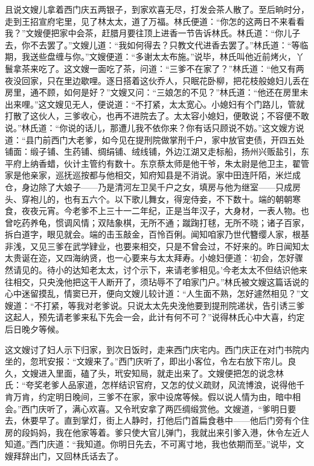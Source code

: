且说文嫂儿拿着西门庆五两银子，到家欢喜无尽，打发会茶人散了。至后晌时分，走到王招宣府宅里，见了林太太，道了万福。林氏便道：“你怎的这两日不来看看我？”文嫂便把家中会茶，赶腊月要往顶上进香一节告诉林氏。林氏道：“你儿子去，你不去罢了。”文嫂儿道：“我如何得去？只教文\textSiTang 代进香去罢了。”林氏道：“等临期，我送些盘缠与你。”文嫂便道：“多谢太太布施。”说毕，林氏叫他近前烤火，丫鬟拿茶来吃了。这文嫂一面吃了茶，问道：“三爹不在家了？”林氏道：“他又有两夜没回家，只在里边歇哩。逐日搭着这伙乔人，只眠花卧柳，把花枝般媳妇儿丢在房里，通不顾，如何是好？”文嫂又问：“三娘怎的不见？”林氏道：“他还在房里未出来哩。”这文嫂见无人，便说道：“不打紧，太太宽心。小媳妇有个门路儿，管就打散了这伙人，三爹收心，也再不进院去了。太太容小媳妇，便敢说；不容便不敢说。”林氏道：“你说的话儿，那遭儿我不依你来？你有话只顾说不妨。”这文嫂方说道：“县门前西门大老爹，如今见在提刑院做掌刑千户，家中放官吏债，开四五处铺面：缎子铺、生药铺、绸绢铺、绒线铺，外边江湖又走标船，扬州兴贩盐引，东平府上纳香蜡，伙计主管约有数十。东京蔡太师是他干爷，朱太尉是他卫主，翟管家是他亲家，巡抚巡按都与他相交，知府知县是不消说。家中田连阡陌，米烂成仓，身边除了大娘子——乃是清河左卫吴千户之女，填房与他为继室——只成房头、穿袍儿的，也有五六个。以下歌儿舞女，得宠侍妾，不下数十。端的朝朝寒食，夜夜元宵。今老爹不上三十一二年纪，正是当年汉子，大身材，一表人物。也曾吃药养龟，惯调风情；双陆象棋，无所不通；蹴踘打毬，无所不晓；诸子百家，拆白道字，眼见就会。端的击玉敲金，百怜百俐。闻知咱家乃世代簪缨人家，根基非浅，又见三爹在武学肄业，也要来相交，只是不曾会过，不好来的。昨日闻知太太贵诞在迩，又四海纳贤，也一心要来与太太拜寿。小媳妇便道：‘初会，怎好骤然请见的。待小的达知老太太，讨个示下，来请老爹相见。’今老太太不但结识他来往相交，只央浼他把这干人断开了，须玷辱不了咱家门户。”林氏被文嫂这篇话说的心中迷留摸乱，情窦已开，便向文嫂儿较计道：“人生面不熟，怎好遽然相见？”文嫂道：“不打紧，等我对老爹说。只说太太先央浼他要到提刑院递状，告引诱三爹这起人，预先请老爹来私下先会一会，此计有何不可？”说得林氏心中大喜，约定后日晚夕等候。

这文嫂讨了妇人示下归家，到次日饭时，走来西门庆宅内。西门庆正在对门书院内坐的，忽玳安报：“文嫂来了。”西门庆听了，即出小客位，令左右放下帘儿。良久，文嫂进入里面，磕了头，玳安知局，就走出来了。文嫂便把怎的说念林氏：“夸奖老爹人品家道，怎样结识官府，又怎的仗义疏财，风流博浪，说得他千肯万肯，约定明日晚间，三爹不在家，家中设席等候。假以说人情为由，暗中相会。”西门庆听了，满心欢喜。又令玳安拿了两匹绸缎赏他。文嫂道，“爹明日要去，休要早了。直到掌灯，街上人静时，打他后门首扁食巷中——他后门旁有个住房的段妈妈，我在他家等着。爹只使大官儿弹门，我就出来引爹入港，休令左近人知道。”西门庆道：“我知道。你明日先去，不可离寸地，我也依期而至。”说毕，文嫂拜辞出门，又回林氏话去了。

